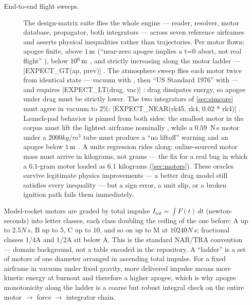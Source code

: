 \begin{description}
\item[End-to-end flight sweeps.] The design-matrix suite flies the whole engine ---
reader, resolver, motor database, propagator, both integrators --- across seven reference
airframes and asserts physical inequalities rather than trajectories. Per motor flown:
apogee finite, above $1\,\mathrm{m}$ (``near-zero apogee implies a t=0 abort, not real flight''
), below $10^{6}\,\mathrm{m}$
, and strictly increasing along the motor ladder
--- \cppinline|EXPECT_GT(ap, prev)| . The
atmosphere sweep flies each motor twice from identical state --- vacuum with
, then ``US Standard 1976'' with 
 --- and requires \cppinline|EXPECT_LT(drag, vac)|
: drag dissipates energy, so apogee under drag must
be strictly lower. The two integrators of \cref{sec:simcore} must agree in vacuum to
$2\%$: \cppinline|EXPECT_NEAR(rk45, rk4, 0.02 * rk4)|
. Launch-pad behavior is pinned from both sides:
the smallest motor in the corpus must lift the lightest airframe nominally
, while a $0.59$~N\,s motor under a
$2000\unit{kg/m^3}$ tube must produce a ``no liftoff'' warning and an apogee below
$1\,\mathrm{m}$ . A units regression rides along:
online-sourced motor mass must arrive in kilograms, not grams
 --- the fix for a real bug in which a
$6.1$-gram motor loaded as $6.1$ kilograms (\cref{sec:motors}). These oracles survive
legitimate physics improvements --- a better drag model still satisfies every
inequality --- but a sign error, a unit slip, or a broken ignition path fails them
immediately.

\end{description}

\begin{physbox}
Model-rocket motors are graded by total impulse $I_{\mathrm{tot}} = \int F(t)\,dt$
(newton-seconds) into letter classes, each class doubling the ceiling of the one before:
A up to $2.5\unit{N\,s}$, B up to $5$, C up to $10$, and so on up to M at
$10240\unit{N\,s}$; fractional classes 1/4A and 1/2A sit below A. This is the standard
NAR/TRA convention --- domain background, not a table encoded in the repository. A
``ladder'' is a set of motors of one diameter arranged in ascending total impulse. For a
fixed airframe in vacuum under fixed gravity, more delivered impulse means more kinetic
energy at burnout and therefore a higher apogee, which is why apogee monotonicity along
the ladder is a coarse but robust integral check on the entire
motor $\to$ force $\to$ integrator chain.
\end{physbox}


